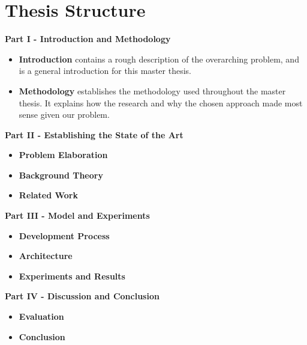 
\section{Thesis Structure}
\noindent
\begin{minipage}{\linewidth}
    \textbf{Part I - Introduction and Methodology}
    \begin{itemize}
        \item\textbf{Introduction} contains a rough description of the overarching problem, and is a general introduction for this master thesis.
        \item\textbf{Methodology} establishes the methodology used throughout the master thesis. It explains how the research and why the chosen approach made most sense given our problem.
    \end{itemize}
\end{minipage}

\vspace{0.5cm}\noindent
\begin{minipage}{\linewidth}
    \textbf{Part II - Establishing the State of the Art}
    \begin{itemize}
        \item\textbf{Problem Elaboration} 
        \item\textbf{Background Theory} 
        \item\textbf{Related Work} 
    \end{itemize}
\end{minipage}

\vspace{0.5cm}\noindent
\begin{minipage}{\linewidth}
    \textbf{Part III - Model and Experiments}
    \begin{itemize}
        \item\textbf{Development Process} 
        \item\textbf{Architecture} 
        \item\textbf{Experiments and Results} 
    \end{itemize}
\end{minipage}

\vspace{0.5cm}\noindent
\begin{minipage}{\linewidth}
    \textbf{Part IV - Discussion and Conclusion}
    \begin{itemize}
        \item\textbf{Evaluation} 
        \item\textbf{Conclusion} 
    \end{itemize}
\end{minipage}